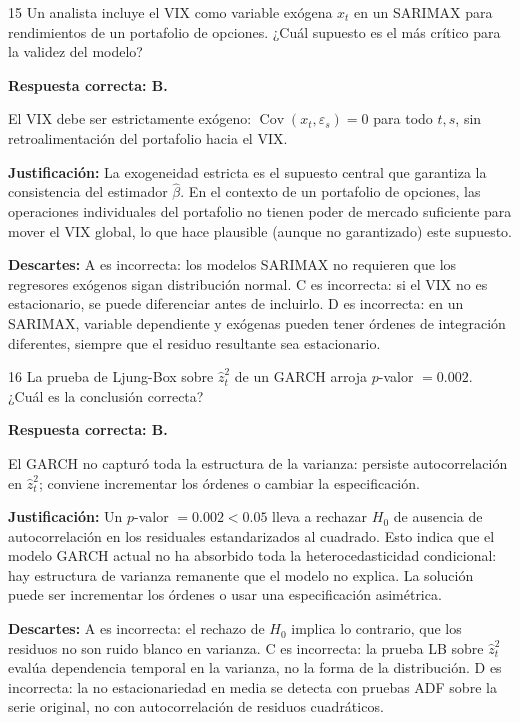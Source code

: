 \documentclass[11pt,a4paper]{article}
\newcommand{\Cov}{\operatorname{Cov}}
\newcommand{\eps}{\varepsilon}
\begin{document}
\begin{cajaCFA}{15}
Un analista incluye el VIX como variable exógena $x_t$ en un SARIMAX para rendimientos de un portafolio de opciones. ¿Cuál supuesto es el más crítico para la validez del modelo?
\end{cajaCFA}

\textbf{Respuesta correcta: B.}

El VIX debe ser estrictamente exógeno: $\Cov(x_t, \eps_s)=0$ para todo $t, s$, sin retroalimentación del portafolio hacia el VIX.

\textbf{Justificación:} La exogeneidad estricta es el supuesto central que garantiza la consistencia del estimador $\hat{\beta}$. En el contexto de un portafolio de opciones, las operaciones individuales del portafolio no tienen poder de mercado suficiente para mover el VIX global, lo que hace plausible (aunque no garantizado) este supuesto.

\textbf{Descartes:} A es incorrecta: los modelos SARIMAX no requieren que los regresores exógenos sigan distribución normal. C es incorrecta: si el VIX no es estacionario, se puede diferenciar antes de incluirlo. D es incorrecta: en un SARIMAX, variable dependiente y exógenas pueden tener órdenes de integración diferentes, siempre que el residuo resultante sea estacionario.

\begin{cajaCFA}{16}
La prueba de Ljung-Box sobre $\hat{z}_t^2$ de un GARCH arroja $p$-valor $=0.002$. ¿Cuál es la conclusión correcta?
\end{cajaCFA}

\textbf{Respuesta correcta: B.}

El GARCH no capturó toda la estructura de la varianza: persiste autocorrelación en $\hat{z}_t^2$; conviene incrementar los órdenes o cambiar la especificación.

\textbf{Justificación:} Un $p$-valor $=0.002<0.05$ lleva a rechazar $H_0$ de ausencia de autocorrelación en los residuales estandarizados al cuadrado. Esto indica que el modelo GARCH actual no ha absorbido toda la heterocedasticidad condicional: hay estructura de varianza remanente que el modelo no explica. La solución puede ser incrementar los órdenes o usar una especificación asimétrica.

\textbf{Descartes:} A es incorrecta: el rechazo de $H_0$ implica lo contrario, que los residuos no son ruido blanco en varianza. C es incorrecta: la prueba LB sobre $\hat{z}_t^2$ evalúa dependencia temporal en la varianza, no la forma de la distribución. D es incorrecta: la no estacionariedad en media se detecta con pruebas ADF sobre la serie original, no con autocorrelación de residuos cuadráticos.
\end{document}
